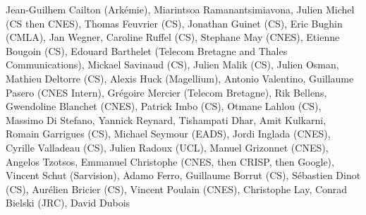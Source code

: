 Jean-Guilhem Cailton (Ark\'emie), Miarintsoa Ramanantsimiavona, Julien Michel (CS then CNES), Thomas Feuvrier (CS), Jonathan Guinet (CS), Eric Bughin (CMLA), Jan Wegner, Caroline Ruffel (CS), Stephane May (CNES), Etienne Bougoin (CS), Edouard Barthelet (Telecom Bretagne and Thales Communications), Mickael Savinaud (CS), Julien Malik (CS), Julien Osman, Mathieu Deltorre (CS), Alexis Huck (Magellium), Antonio Valentino, Guillaume Pasero (CNES Intern), Gr\'egoire Mercier (Telecom Bretagne), Rik Bellens, Gwendoline Blanchet (CNES), Patrick Imbo (CS), Otmane Lahlou (CS), Massimo Di Stefano, Yannick Reynard, Tishampati Dhar, Amit Kulkarni, Romain Garrigues (CS), Michael Seymour (EADS), Jordi Inglada (CNES), Cyrille Valladeau (CS), Julien Radoux (UCL), Manuel Grizonnet (CNES), Angelos Tzotsos, Emmanuel Christophe (CNES, then CRISP, then Google), Vincent Schut (Sarvision), Adamo Ferro, Guillaume Borrut (CS), S\'ebastien Dinot (CS), Aur\'elien Bricier (CS), Vincent Poulain (CNES), Christophe Lay, Conrad Bielski (JRC), David Dubois